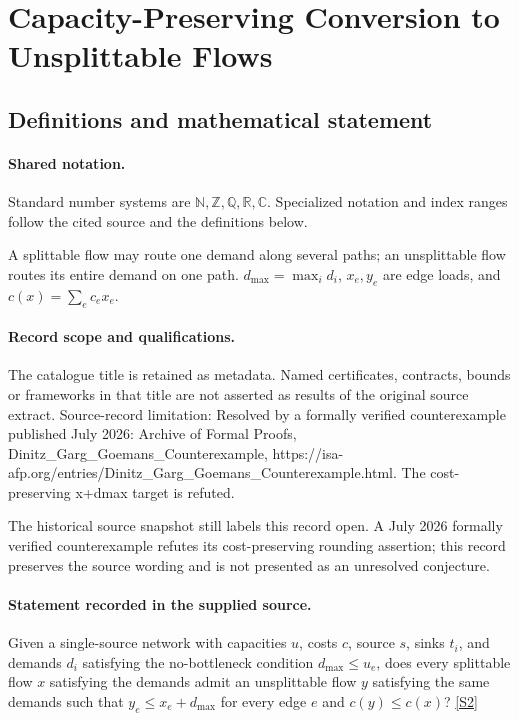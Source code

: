 \documentclass[11pt]{article}
\newcommand{\sref}[2]{\hyperlink{source:#1:#2}{[S#2]}}
\begin{document}
\section{Capacity-Preserving Conversion to Unsplittable Flows}\label{statement}

\subsection{Definitions and mathematical statement}

\paragraph{Shared notation.}Standard number systems are $\mathbb N,\mathbb Z,\mathbb Q,\mathbb R,\mathbb C$. Specialized notation and index ranges follow the cited source and the definitions below.


A splittable flow may route one demand along several paths; an unsplittable flow routes its entire demand on one path. $d_{\max}=\max_i d_i$, $x_e,y_e$ are edge loads, and $c(x)=\sum_e c_e x_e$.
\paragraph{Record scope and qualifications.}
The catalogue title is retained as metadata. Named certificates, contracts, bounds or frameworks in that title are not asserted as results of the original source extract.
Source-record limitation: Resolved by a formally verified counterexample published July 2026: Archive of Formal Proofs, Dinitz_Garg_Goemans_Counterexample, https://isa-afp.org/entries/Dinitz_Garg_Goemans_Counterexample.html. The cost-preserving x+dmax target is refuted.

The historical source snapshot still labels this record open. A July 2026 formally verified counterexample refutes its cost-preserving rounding assertion; this record preserves the source wording and is not presented as an unresolved conjecture.
\paragraph{Statement recorded in the supplied source.}
Given a single-source network with capacities $u$, costs $c$, source $s$, sinks $t_i$, and demands $d_i$ satisfying the no-bottleneck condition $d_{\max}\leq u_e$, does every splittable flow $x$ satisfying the demands admit an unsplittable flow $y$ satisfying the same demands such that $y_e\leq x_e+d_{\max}$ for every edge $e$ and $c(y)\leq c(x)$? \sref{statement}{2}
\end{document}
